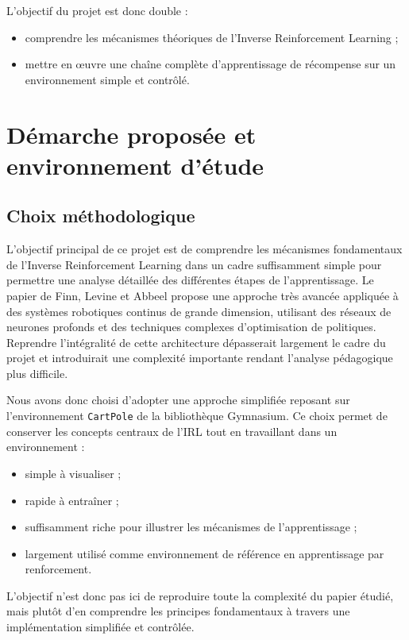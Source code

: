 L’objectif du projet est donc double :
\begin{itemize}
    \item comprendre les mécanismes théoriques de l’Inverse Reinforcement Learning ;
    \item mettre en œuvre une chaîne complète d’apprentissage de récompense sur un environnement simple et contrôlé.
\end{itemize}



\section{Démarche proposée et environnement d’étude}

\subsection{Choix méthodologique}

L’objectif principal de ce projet est de comprendre les mécanismes fondamentaux de l’Inverse Reinforcement Learning dans un cadre suffisamment simple pour permettre une analyse détaillée des différentes étapes de l’apprentissage. Le papier de Finn, Levine et Abbeel propose une approche très avancée appliquée à des systèmes robotiques continus de grande dimension, utilisant des réseaux de neurones profonds et des techniques complexes d’optimisation de politiques. Reprendre l’intégralité de cette architecture dépasserait largement le cadre du projet et introduirait une complexité importante rendant l’analyse pédagogique plus difficile.

Nous avons donc choisi d’adopter une approche simplifiée reposant sur l’environnement \texttt{CartPole} de la bibliothèque Gymnasium. Ce choix permet de conserver les concepts centraux de l’IRL tout en travaillant dans un environnement :
\begin{itemize}
    \item simple à visualiser ;
    \item rapide à entraîner ;
    \item suffisamment riche pour illustrer les mécanismes de l’apprentissage ;
    \item largement utilisé comme environnement de référence en apprentissage par renforcement.
\end{itemize}

L’objectif n’est donc pas ici de reproduire toute la complexité du papier étudié, mais plutôt d’en comprendre les principes fondamentaux à travers une implémentation simplifiée et contrôlée.

